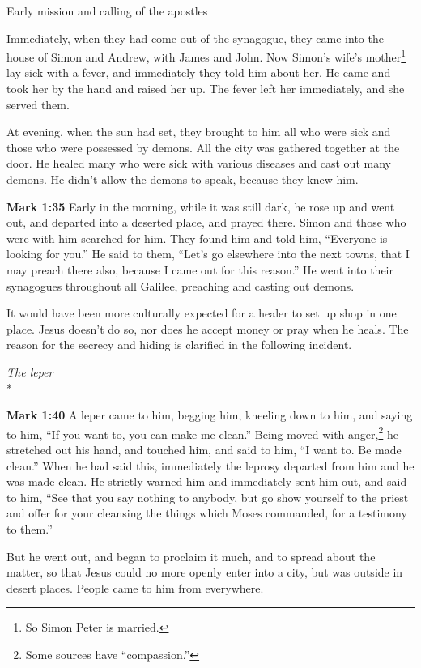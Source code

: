 \documentclass[10pt,twoside]{article} %
\newcommand{\doimage}[2]{\texttt{[image: \#2]}\label{fig:#2}}
\newcommand{\figbasic}[4]{ %
    \ifthenelse{\isodd{\pageref{fig:#2}}}{}{\hfill}
    \ifstrempty{#3}{
      \doimage{#1}{#2}
    }{
      \makebox{\doimage{#1}{#2} \\ #3}
    }
    \ifthenelse{\isodd{\pageref{fig:#2}}}{\hfill}{}
    \par
}
\newcommand{\fig}[2][0.4]{
  \figbasic{#1}{#2}{}{}
}
\newcommand{\quotesize}{\normalsize{}}
\newcommand{\comm}[1]{\begingroup \color{black!50} #1\endgroup}
\newenvironment{quotetext}{\begingroup\quotesize}{\endgroup}
\newcommand{\intex}[1]{\index[texts]{#1}}
\newcommand{\bible}[2]{\begin{quotetext}\textbf{#1}\intex{#1} #2\end{quotetext}}
\newcommand{\gospelmark}[2]{\bible{Mark #1}{#2}}
\newcommand{\subhead}[1]{\emph{#1}\\*}
\begin{document}
\begin{section}{Early mission and calling of the apostles}
{  Immediately, when they had come out of the synagogue, they came into the house of Simon and Andrew, with James and John.
   Now Simon's wife's mother\footnote{So Simon Peter is married.} lay sick with a fever, and immediately they told him about her.   He came and took her by the hand and raised her up. The fever left her immediately, and she served them.

  At evening, when the sun had set, they brought to him all who were sick and those who were possessed by demons.   All the city was gathered together at the door.   He healed many who were sick with various diseases and cast out many demons. He didn't allow the demons to speak, because they knew him.}

\fig[0.6]{driving-out-demons}

\gospelmark{1:35}{Early in the morning, while it was still dark, he rose up and went out, and departed into a deserted place, and prayed there.   Simon and those who were with him searched for him.   They found him and told him, ``Everyone is looking for you.''
  He said to them, ``Let's go elsewhere into the next towns, that I may preach there also, because I came out for this reason.''   He went into their synagogues throughout all Galilee, preaching and casting out demons.}

\comm{
It would have been more culturally expected for a healer to set up shop in one place. Jesus doesn't do so, nor does
he accept money or pray when he heals. The reason for the secrecy and hiding is clarified in the following incident.
}

\subhead{The leper}

\gospelmark{1:40}{A leper came to him, begging him, kneeling down to him, and saying to him, ``If you want to, you can make me clean.''
  Being moved with anger,\footnote{Some sources have ``compassion.''} he stretched out his hand, and touched him, and said to him, ``I want to. Be made clean.''   When he had said this, immediately the leprosy departed from him and he was made clean.   He strictly warned him and immediately sent him out,   and said to him, ``See that you say nothing to anybody, but go show yourself to the priest and offer for your cleansing the things which Moses commanded, for a testimony to them.''

  But he went out, and began to proclaim it much, and to spread about the matter, so that Jesus could no more openly enter into a city, but was outside in desert places. People came to him from everywhere. }


\end{section}
\end{document}
